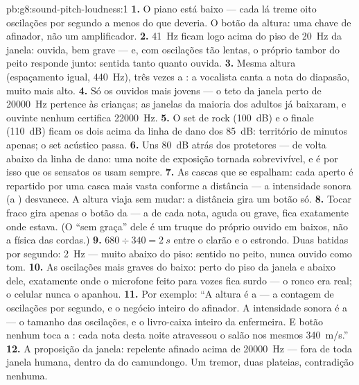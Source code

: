 \begin{solution}{pb:g8:sound-pitch-loudness:1}
\textbf{1.} O piano está baixo --- cada lá treme oito oscilações por
segundo a menos do que deveria. O botão da altura: uma chave de
afinador, não um amplificador.
\textbf{2.} \qty{41}{Hz} ficam logo acima do piso de \qty{20}{Hz} da
janela: ouvida, bem grave --- e, com oscilações tão lentas, o próprio
tambor do peito responde junto: sentida tanto quanto ouvida.
\textbf{3.} Mesma altura (espaçamento igual, \qty{440}{Hz}), três
vezes a : a vocalista canta a nota do diapasão, muito mais
alto.
\textbf{4.} Só os ouvidos mais jovens --- o teto da janela perto de
\qty{20000}{Hz} pertence às crianças; as janelas da maioria dos
adultos já baixaram, e ouvinte nenhum certifica \qty{22000}{Hz}.
\textbf{5.} O set de rock (\qty{100}{dB}) e o finale (\qty{110}{dB})
ficam os dois acima da linha de dano dos \qty{85}{dB}: território de
minutos apenas; o set acústico passa.
\textbf{6.} Uns \qty{80}{dB} atrás dos protetores --- de volta abaixo
da linha de dano: uma noite de exposição tornada sobrevivível, e é
por isso que os sensatos os usam sempre.
\textbf{7.} As cascas que se espalham: cada aperto é repartido por
uma casca mais vasta conforme a distância --- a intensidade sonora (a
) desvanece. A altura viaja sem mudar: a distância gira um
botão só.
\textbf{8.} Tocar fraco gira apenas o botão da  --- a
 de cada nota, aguda ou grave, fica exatamente onde estava.
(O ``sem graça'' dele é um truque do próprio ouvido em 
baixos, não a física das cordas.)
\textbf{9.} $680 \div 340 = \qty{2}{s}$ entre o clarão e o estrondo.
Duas batidas por segundo: \qty{2}{Hz} --- muito abaixo do piso:
sentido no peito, nunca ouvido como tom.
\textbf{10.} As oscilações mais graves do baixo: perto do piso da
janela e abaixo dele, exatamente onde o microfone feito para vozes
fica surdo --- o ronco era real; o celular nunca o apanhou.
\textbf{11.} Por exemplo: ``A altura é a  --- a contagem de
oscilações por segundo, e o negócio inteiro do afinador. A intensidade
sonora é a  --- o tamanho das oscilações, e o livro-caixa
inteiro da enfermeira. E botão nenhum toca a : cada nota
desta noite atravessou o salão nos mesmos \qty{340}{m/s}.''
\textbf{12.} A proposição da janela: repelente afinado acima de
\qty{20000}{Hz} --- fora de toda janela humana, dentro da do
camundongo. Um tremor, duas plateias, contradição nenhuma.
\end{solution}
